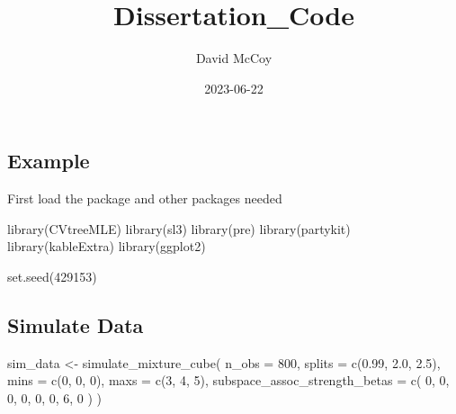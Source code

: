 \documentclass[
]{article}
\title{Dissertation\_Code}
\author{David McCoy}
\date{2023-06-22}
\newenvironment{Shaded}{\begin{snugshade}}{\end{snugshade}}
\newcommand{\AttributeTok}[1]{\textcolor[rgb]{0.77,0.63,0.00}{#1}}
\newcommand{\DecValTok}[1]{\textcolor[rgb]{0.00,0.00,0.81}{#1}}
\newcommand{\FloatTok}[1]{\textcolor[rgb]{0.00,0.00,0.81}{#1}}
\newcommand{\FunctionTok}[1]{\textcolor[rgb]{0.00,0.00,0.00}{#1}}
\newcommand{\NormalTok}[1]{#1}
\newcommand{\OtherTok}[1]{\textcolor[rgb]{0.56,0.35,0.01}{#1}}
\begin{document}
\maketitle

\hypertarget{example}{%
\subsection{Example}\label{example}}

First load the package and other packages needed

\begin{Shaded}
\begin{Highlighting}[]
\FunctionTok{library}\NormalTok{(CVtreeMLE)}
\FunctionTok{library}\NormalTok{(sl3)}
\FunctionTok{library}\NormalTok{(pre)}
\FunctionTok{library}\NormalTok{(partykit)}
\FunctionTok{library}\NormalTok{(kableExtra)}
\FunctionTok{library}\NormalTok{(ggplot2)}

\FunctionTok{set.seed}\NormalTok{(}\DecValTok{429153}\NormalTok{)}
\end{Highlighting}
\end{Shaded}

\hypertarget{simulate-data}{%
\subsection{Simulate Data}\label{simulate-data}}

\begin{Shaded}
\begin{Highlighting}[]
\NormalTok{sim\_data }\OtherTok{\textless{}{-}} \FunctionTok{simulate\_mixture\_cube}\NormalTok{(}
  \AttributeTok{n\_obs =} \DecValTok{800}\NormalTok{,}
  \AttributeTok{splits =} \FunctionTok{c}\NormalTok{(}\FloatTok{0.99}\NormalTok{, }\FloatTok{2.0}\NormalTok{, }\FloatTok{2.5}\NormalTok{),}
  \AttributeTok{mins =} \FunctionTok{c}\NormalTok{(}\DecValTok{0}\NormalTok{, }\DecValTok{0}\NormalTok{, }\DecValTok{0}\NormalTok{),}
  \AttributeTok{maxs =} \FunctionTok{c}\NormalTok{(}\DecValTok{3}\NormalTok{, }\DecValTok{4}\NormalTok{, }\DecValTok{5}\NormalTok{),}
  \AttributeTok{subspace\_assoc\_strength\_betas =} \FunctionTok{c}\NormalTok{(}
    \DecValTok{0}\NormalTok{, }\DecValTok{0}\NormalTok{, }\DecValTok{0}\NormalTok{, }\DecValTok{0}\NormalTok{,}
    \DecValTok{0}\NormalTok{, }\DecValTok{0}\NormalTok{, }\DecValTok{6}\NormalTok{, }\DecValTok{0}
\NormalTok{  )}
\NormalTok{)}
\end{Highlighting}
\end{Shaded}
\end{document}

